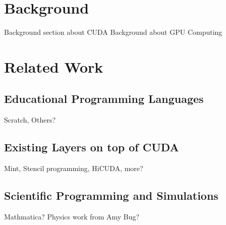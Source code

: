\section{Background}

Background section about CUDA
Background about GPU Computing

\section{Related Work}


\subsection{Educational Programming Languages}
Scratch, Others?

\subsection{Existing Layers on top of CUDA}
Mint, Stencil programming, HiCUDA, more?

\subsection{Scientific Programming and Simulations}
Mathmatica? Physics work from Amy Bug?
